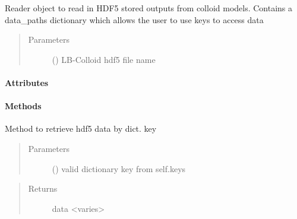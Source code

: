 \documentclass[letterpaper,10pt,english]{sphinxmanual}
\begin{document}

\begin{fulllineitems}
\label{\detokenize{index:lb_colloids.Colloids.Colloid_output.Hdf5Reader}}
Reader object to read in HDF5 stored outputs
from colloid models. Contains a data\_paths dictionary
which allows the user to use keys to access data
\begin{quote}\begin{description}
\item[{Parameters}] \leavevmode
{} () \textendash{} LB-Colloid hdf5 file name

\end{description}\end{quote}
\paragraph{Attributes}
\paragraph{Methods}

\begin{fulllineitems}
\label{\detokenize{index:lb_colloids.Colloids.Colloid_output.Hdf5Reader.get_data}}
Method to retrieve hdf5 data by dict. key
\begin{quote}\begin{description}
\item[{Parameters}] \leavevmode
{} () \textendash{} valid dictionary key from self.keys

\end{description}\end{quote}
\begin{quote}\begin{description}
\item[{Returns}] \leavevmode
data \textless{}varies\textgreater{}

\end{description}\end{quote}

\end{fulllineitems}


\end{fulllineitems}
\end{document}
